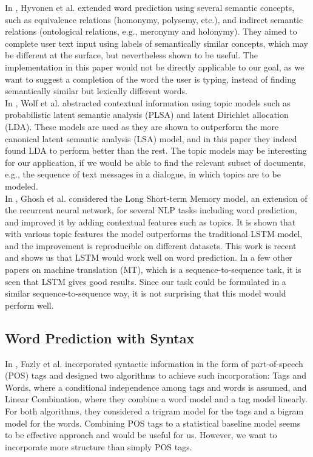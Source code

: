 \documentclass[14pt, oneside]{article}   	%
\begin{document}
In \cite{hyvonen2006semantic},
Hyvonen et al. extended word prediction using several semantic concepts,
such as equivalence relations (homonymy, polysemy, etc.),
and indirect semantic relations (ontological relations, e.g., meronymy and holonymy).
They aimed to complete user text input using labels of semantically similar concepts,
which may be different at the surface, but nevertheless shown to be useful.
The implementation in this paper would not be directly applicable to our goal,
as we want to suggest a completion of the word the user is typing,
instead of finding semantically similar but lexically different words.\\

In \cite{wolf2006use},
Wolf et al. abstracted contextual information using topic models
such as probabilistic latent semantic analysis (PLSA) and latent Dirichlet allocation (LDA).
These models are used as they are shown to outperform the more canonical latent semantic analysis (LSA) model,
and in this paper they indeed found LDA to perform better than the rest.
The topic models may be interesting for our application,
if we would be able to find the relevant subset of documents,
e.g., the sequence of text messages in a dialogue, in which topics are to be modeled.\\

In \cite{ghosh2016contextual},
Ghosh et al. considered the Long Short-term Memory model,
an extension of the recurrent neural network, for several NLP tasks including word prediction,
and improved it by adding contextual features such as topics.
It is shown that with various topic features the model outperforms the traditional LSTM model,
and the improvement is reproducible on different datasets.
This work is recent and shows us that LSTM would work well on word prediction.
In a few other papers on machine translation (MT),
which is a sequence-to-sequence task, it is seen that LSTM gives good results.
Since our task could be formulated in a similar sequence-to-sequence way,
it is not surprising that this model would perform well.

\subsection{Word Prediction with Syntax}
In \cite{fazly2003testing},
Fazly et al. incorporated syntactic information in the form of part-of-speech (POS) tags
and designed two algorithms to achieve such incorporation:
Tags and Words, where a conditional independence among tags and words is assumed,
and Linear Combination, where they combine a word model and a tag model linearly.
For both algorithms, they considered a trigram model for the tags
and a bigram model for the words.
Combining POS tags to a statistical baseline model seems to be effective approach
and would be useful for us.
However, we want to incorporate more structure than simply POS tags.\\
\end{document}
